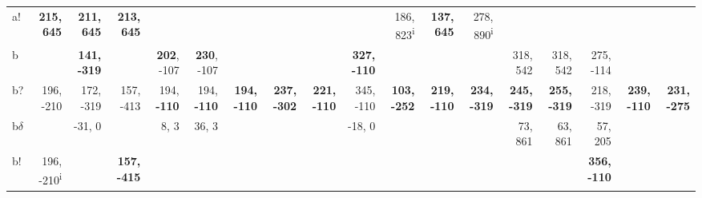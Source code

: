 \begin{table}[p]
{\begin{tabular}{lrrrrrrrrrrrrrrrrr}
a! & \textbf{215, 645} & \textbf{211, 645} & \textbf{213, 645} &  &  &  &  &  &  & 186, 823\textsuperscript{i} & \textbf{137, 645} & 278, 890\textsuperscript{i} &  &  &  &  &  \\
b &  & \textbf{141, -319} &  & \textbf{202}, -107 & \textbf{230}, -107 &  &  &  & \textbf{327, -110} &  &  &  & 318, 542 & 318, 542 & 275, -114 &  &  \\
b? & 196, -210 & 172, -319 & 157, -413 & 194, \textbf{-110} & 194, \textbf{-110} & \textbf{194, -110} & \textbf{237, -302} & \textbf{221, -110} & 345, -110 & \textbf{103, -252} & \textbf{219, -110} & \textbf{234, -319} & \textbf{245, -319} & \textbf{255, -319} & 218, -319 & \textbf{239, -110} & \textbf{231, -275} \\
b$\delta$ &  & -31, 0 &  & 8, 3 & 36, 3 &  &  &  & -18, 0 &  &  &  & 73, 861 & 63, 861 & 57, 205 &  &  \\
b! & 196, -210\textsuperscript{i} &  & \textbf{157, -415} &  &  &  &  &  &  &  &  &  &  &  & \textbf{356, -110} &  &  \\

\end{tabular}
}
\end{table}
\clearpage


